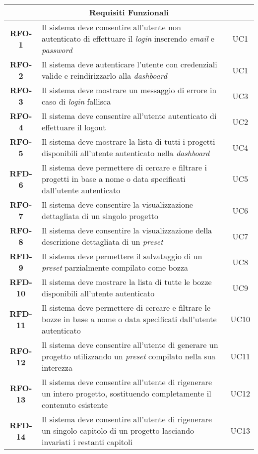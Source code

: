 \begin{longtable}{|c|>{\centering\arraybackslash}p{}|c|}
    \hline
    \multicolumn{3}{|c|}{\rowcolor{green!30} \textbf{Requisiti Funzionali}} \\
    \hline %
    \textbf{RFO-1} & Il sistema deve consentire all'utente non autenticato di effettuare il \textit{login} inserendo \textit{email} e \textit{password} & UC1 \\
    \hline
    \textbf{RFO-2} & Il sistema deve autenticare l'utente con credenziali valide e reindirizzarlo alla \textit{dashboard} & UC1 \\
    \hline
    \textbf{RFO-3} & Il sistema deve mostrare un messaggio di errore in caso di \textit{login} fallisca & UC3 \\
    \hline
    \textbf{RFO-4} & Il sistema deve consentire all'utente autenticato di effettuare il logout & UC2 \\
    \hline
    \textbf{RFO-5} &  Il sistema deve mostrare la lista di tutti i progetti disponibili all'utente autenticato nella \textit{dashboard} & UC4 \\
    \hline
    \textbf{RFD-6} & Il sistema deve permettere di cercare e filtrare i progetti in base a nome o data specificati dall’utente autenticato & UC5 \\
    \hline
    \textbf{RFO-7} & Il sistema deve consentire la visualizzazione dettagliata di un singolo progetto & UC6 \\
    \hline
    \textbf{RFO-8} & Il sistema deve consentire la visualizzazione della descrizione dettagliata di un \textit{preset} & UC7 \\
    \hline
    \textbf{RFD-9} & Il sistema deve permettere il salvataggio di un \textit{preset} parzialmente compilato come bozza & UC8 \\
    \hline
    \textbf{RFD-10} & Il sistema deve mostrare la lista di tutte le bozze disponibili all'utente autenticato & UC9 \\
    \hline
    \textbf{RFD-11} & Il sistema deve permettere di cercare e filtrare le bozze in base a nome o data specificati dall’utente autenticato & UC10 \\
    \hline
    \textbf{RFO-12} & Il sistema deve consentire all'utente di generare un progetto utilizzando un \textit{preset} compilato nella sua interezza & UC11 \\
    \hline
    \textbf{RFO-13} & Il sistema deve consentire all'utente di rigenerare un intero progetto, sostituendo completamente il contenuto esistente & UC12 \\
    \hline
    \textbf{RFD-14} & Il sistema deve consentire all'utente di rigenerare un singolo capitolo di un progetto lasciando invariati i restanti capitoli & UC13 \\

\end{longtable}
